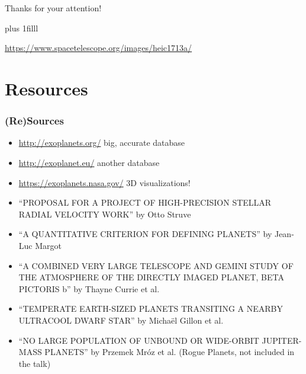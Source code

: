 \documentclass[presentation,t,aspectratio=169]{beamer}
\newcommand{\btVFill}{\vskip0pt plus 1filll}
\begin{document}
{
  \begin{frame}[plain]
    \bigskip
    \hfill  \color{white} Thanks for your attention!

    \btVFill
   
    \hfill\tiny\color{white}\url{https://www.spacetelescope.org/images/heic1713a/}\bigskip
  \end{frame}
}

\section*{Resources}
\begin{frame}
  \frametitle{(Re)Sources}
  \begin{itemize}
  \item \scriptsize \url{http://exoplanets.org/} big, accurate database \normalsize
  \item \scriptsize \url{http://exoplanet.eu/} another database \normalsize
  \item \scriptsize \url{https://exoplanets.nasa.gov/} 3D visualizations! \normalsize
  \item \tiny{``PROPOSAL FOR A PROJECT OF HIGH-PRECISION STELLAR RADIAL VELOCITY WORK''} by Otto Struve \normalsize
  \item \tiny{``A QUANTITATIVE CRITERION FOR DEFINING PLANETS''}  by Jean-Luc Margot \normalsize
  \item \tiny{``A COMBINED VERY LARGE TELESCOPE AND GEMINI STUDY OF THE ATMOSPHERE
      OF THE DIRECTLY IMAGED PLANET, BETA PICTORIS b''} by Thayne Currie et al. \normalsize
  \item \tiny{``TEMPERATE EARTH-SIZED PLANETS TRANSITING A NEARBY
ULTRACOOL DWARF STAR''} by
    Michaël Gillon  et al. \normalsize
  \item \tiny{``NO LARGE POPULATION OF UNBOUND OR WIDE-ORBIT
      JUPITER-MASS PLANETS''} by Przemek Mróz et al. (Rogue Planets, not included in the talk) \normalsize 

  \end{itemize}
\end{frame}
\end{document}
